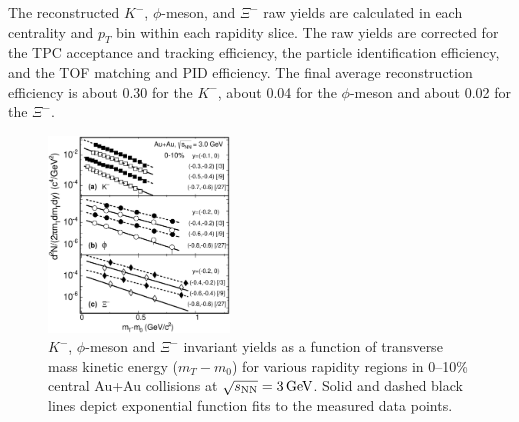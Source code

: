 \documentclass[%
 reprint,	
showpacs,
 amsmath,amssymb,
 aps,
 prc,
]{revtex4-1}
\begin{document}
The reconstructed $K^-$, $\phi$-meson, and $\Xi^-$ raw yields are calculated in each centrality and $p_{T}$ bin within each rapidity slice. 
The raw yields are corrected for the TPC acceptance and tracking efficiency, %
the particle identification efficiency, %
and the TOF matching and PID efficiency. The final average reconstruction efficiency is about 0.30 for the $K^-$, about 0.04 for the $\phi$-meson and about 0.02 for the $\Xi^-$.

\begin{figure}
\centering
\hspace*{-4mm}
\includegraphics[width=0.43\textwidth]{fig/fig2_h_mT_spectra_phiMeson.eps}
  \caption{ $K^-$, $\phi$-meson and $\Xi^-$ invariant yields as a function of transverse mass kinetic energy ($m_T-m_0$) for various rapidity regions in 0--10\% central Au+Au collisions at ${\sqrt{s_{\rm NN}} = \rm{3\,GeV}}$. Solid and dashed black lines depict exponential function fits to the measured data points.}
\label{fig:phimTSpectra} 
\end{figure}
\end{document}

